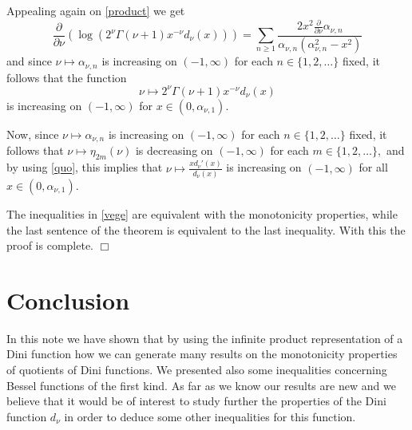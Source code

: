 \documentclass[journal]{IEEEtran}
\begin{document}
 Appealing again on \eqref{product}
we get $$\frac{\partial}{\partial\nu}\left(\log\left(2^{\nu}\Gamma(\nu+1)x^{-\nu}d_{\nu}(x)\right)\right)=
\sum_{n\geq1}\frac{2x^2\frac{\partial}{\partial\nu}\alpha_{\nu,n}}{\alpha_{\nu,n}(\alpha_{\nu,n}^2-x^2)}$$
and since $\nu\mapsto\alpha_{\nu,n}$ is increasing on $(-1,\infty)$ for each $n\in\{1,2,\dots\}$ fixed, it follows that the function
$$\nu\mapsto 2^{\nu}\Gamma(\nu+1)x^{-\nu}d_{\nu}(x)$$ is increasing on $(-1,\infty)$ for $x\in(0,\alpha_{\nu,1}).$

Now, since $\nu\mapsto\alpha_{\nu,n}$ is increasing on $(-1,\infty)$ for each $n\in\{1,2,\dots\}$ fixed, it follows that $\nu\mapsto\eta_{2m}(\nu)$ is decreasing on $(-1,\infty)$ for each $m\in\{1,2,\dots\},$ and by using \eqref{quo}, this implies that $\nu\mapsto \frac{xd_{\nu}'(x)}{d_{\nu}(x)}$
is increasing on $(-1,\infty)$ for all $x\in(0,\alpha_{\nu,1}).$

The inequalities in \eqref{vege} are equivalent with the monotonicity properties, while the last sentence of the theorem is equivalent to the last inequality. With this the proof is complete. \medskip \hfill $\Box$

\section{Conclusion}

In this note we have shown that by using the infinite product representation of a Dini function how we can generate many results on 
the monotonicity properties of quotients of Dini functions. We presented also some inequalities concerning Bessel functions of the first kind. 
As far as we know our results are new and we believe that it would be of interest to study further the properties of the Dini function $d_{\nu}$ in order to deduce some other inequalities for this function.
\end{document}
